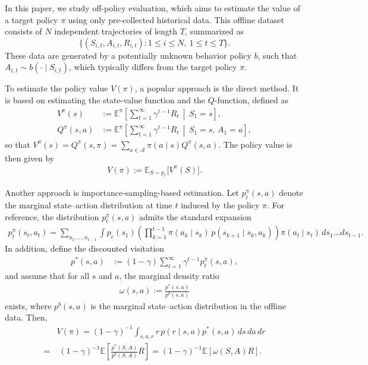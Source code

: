 \documentclass[12pt]{article}
\newcommand{\0}{\boldsymbol{0}}
\newcommand{\E}{\mathbb{E}}
\begin{document}
In this paper, we study off-policy evaluation, which aims to estimate the value of a target policy $\pi$ using only pre-collected historical data. This offline dataset consists of $N$ independent trajectories of length $T$, summarized as $$\{(S_{i,t}, A_{i,t}, R_{i,t}) : 1\le i\le N,\ 1\le t\le T\}.$$ These data are generated by a potentially unknown behavior policy $b$, such that $A_{i,t} \sim b(\cdot\mid S_{i,t})$, which typically differs from the target policy $\pi$.



To estimate the policy value $V(\pi)$, a popular approach is the direct method. It is based on estimating the state-value function and the $Q$-function, defined as
\begin{align*}
V^\pi(s)
&:= \E^\pi\!\left[\sum_{t=1}^\infty \gamma^{t-1} R_t\,\middle\vert\, S_1=s\right],
\\
Q^\pi(s,a)
&:= \E^\pi\!\left[\sum_{t=1}^\infty \gamma^{t-1} R_t\,\middle\vert\, S_1=s,\,A_1=a\right],
\end{align*}
so that $V^\pi(s)=Q^\pi(s,\pi)=\sum_{a\in\mathcal A} \pi(a\mid s)Q^\pi(s,a)$.
The policy value is then given by
\begin{align*}
V(\pi):=\E_{S\sim p_e}\big[V^\pi(S)\big].
\end{align*}


Another approach is importance-sampling-based estimation. Let $p_t^\pi(s,a)$ denote the marginal state--action distribution at time $t$ induced by the policy $\pi$. For reference, the distribution $p_t^\pi(s,a)$ admits the standard expansion
\begin{gather*}
 p_t^\pi(s_t,a_t)
 = \sum_{a_1,\dots,a_{t-1}}\int p_e(s_1)
 \left( \prod_{k=1}^{t-1} \pi(a_k\mid s_k)\, p(s_{k+1}\mid s_k, a_k) \right)
 \pi(a_t\mid s_t)\, ds_{1}\dots ds_{t-1}.
\end{gather*}
In addition, define the discounted visitation
\begin{align*}
 p^*(s,a)
 &:=(1-\gamma)\sum_{t=1}^\infty \gamma^{t-1} p_t^\pi(s,a),
\end{align*}
and assume that for all $s$ and $a$, the marginal density ratio
\begin{align*}
\omega(s,a):=\frac{p^*(s,a)}{p^b(s,a)}
\end{align*} exists,  where $
 p^b(s,a)$ is the marginal state--action distribution in the offline data.
 Then,
\begin{align*}
    &V(\pi)
    =(1-\gamma)^{-1} \int_{s,a,r} r\, p(r\mid s,a) p^*(s,a)\, ds\, da\, dr
    \\
    = & \;(1-\gamma)^{-1} \E\left[\frac{p^*(S,A)}{p^b(S,A)}R\right]
    =(1-\gamma)^{-1} \E\left[\omega(S,A)R\right].
\end{align*} 
\end{document}
